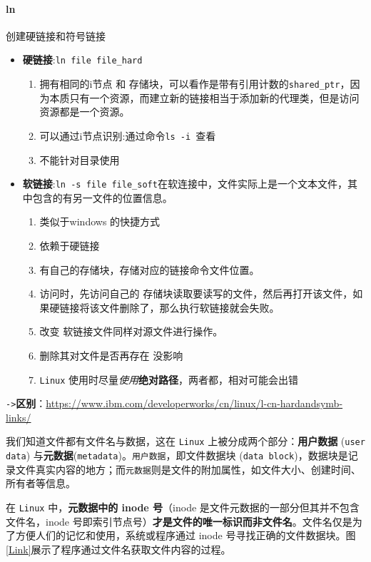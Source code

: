 \documentclass[UTF8,a4paper,12pt]{ctexbook}
\begin{document}
		\paragraph{ln} 创建硬链接和符号链接
			\begin{itemize}
				\item \textbf{硬链接}:\verb|ln file file_hard|
					\begin{enumerate}
						\item 拥有相同的i节点  和 存储块，可以看作是带有引用计数的\verb|shared_ptr|，因为本质只有一个资源，而建立新的链接相当于添加新的代理类，但是访问资源都是一个资源。
						\item 可以通过i节点识别:通过命令\verb|ls -i |查看
						\item 不能针对目录使用
					\end{enumerate}
					
				\item \textbf{软链接}:\verb|ln -s file file_soft|在软连接中，文件实际上是一个文本文件，其中包含的有另一文件的位置信息。
					\begin{enumerate}
						\item 类似于windows 的快捷方式
						\item 依赖于硬链接
						\item 有自己的存储块，存储对应的链接命令文件位置。
						\item 访问时，先访问自己的 存储块读取要读写的文件，然后再打开该文件，如果硬链接将该文件删除了，那么执行软链接就会失败。
						\item 改变 软链接文件同样对源文件进行操作。
						\item 删除其对文件是否再存在 没影响
						
						\item \verb|Linux| 使用时尽量\textit{使用}\textbf{绝对路径}，两者都，相对可能会出错
					\end{enumerate}
			\end{itemize}
			
			\verb|->|\textbf{区别}：\url{https://www.ibm.com/developerworks/cn/linux/l-cn-hardandsymb-links/}
			
			我们知道文件都有文件名与数据，这在 \verb|Linux| 上被分成两个部分：\textbf{用户数据} (\verb|user data|) 与\textbf{元数据}(\verb|metadata|)。\verb|用户数据|，即文件数据块 (\verb|data block|)，数据块是记录文件真实内容的地方；而\verb|元数据|则是文件的附加属性，如文件大小、创建时间、所有者等信息。
			
			在 \verb|Linux| 中，\textbf{元数据中的 inode 号}（inode 是文件元数据的一部分但其并不包含文件名，inode 号即索引节点号）\textbf{才是文件的唯一标识而非文件名}。文件名仅是为了方便人们的记忆和使用，系统或程序通过 inode 号寻找正确的文件数据块。图\ref{Link}展示了程序通过文件名获取文件内容的过程。
			
\end{document}
